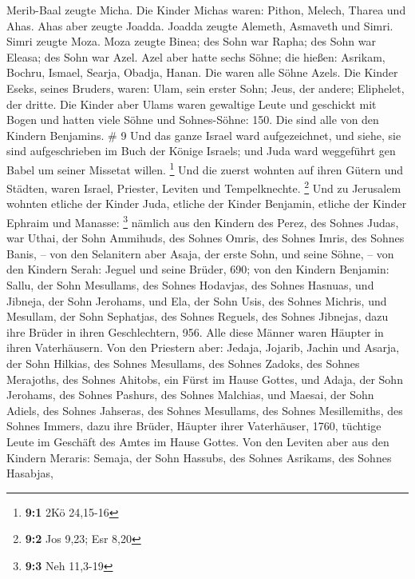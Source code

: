 Merib-Baal zeugte Micha.  Die Kinder Michas waren: Pithon,
Melech, Tharea und Ahas.  Ahas aber zeugte Joadda. Joadda
zeugte Alemeth, Asmaveth und Simri. Simri zeugte Moza. 
Moza zeugte Binea; des Sohn war Rapha; des Sohn war Eleasa; des Sohn war
Azel.  Azel aber hatte sechs Söhne; die hießen: Asrikam,
Bochru, Ismael, Searja, Obadja, Hanan. Die waren alle Söhne Azels.
 Die Kinder Eseks, seines Bruders, waren: Ulam, sein erster
Sohn; Jeus, der andere; Eliphelet, der dritte.  Die Kinder
aber Ulams waren gewaltige Leute und geschickt mit Bogen und hatten
viele Söhne und Sohnes-Söhne: 150. Die sind alle von den Kindern
Benjamins. \# 9  Und das ganze Israel ward aufgezeichnet,
und siehe, sie sind aufgeschrieben im Buch der Könige Israels; und Juda
ward weggeführt gen Babel um seiner Missetat willen. \footnote{\textbf{9:1}
  2Kö 24,15-16}  Und die zuerst wohnten auf ihren Gütern und
Städten, waren Israel, Priester, Leviten und Tempelknechte. \footnote{\textbf{9:2}
  Jos 9,23; Esr 8,20}  Und zu Jerusalem wohnten etliche der
Kinder Juda, etliche der Kinder Benjamin, etliche der Kinder Ephraim und
Manasse: \footnote{\textbf{9:3} Neh 11,3-19}  nämlich aus
den Kindern des Perez, des Sohnes Judas, war Uthai, der Sohn Ammihuds,
des Sohnes Omris, des Sohnes Imris, des Sohnes Banis, -- 
von den Selanitern aber Asaja, der erste Sohn, und seine Söhne, --
 von den Kindern Serah: Jeguel und seine Brüder, 690;
 von den Kindern Benjamin: Sallu, der Sohn Mesullams, des
Sohnes Hodavjas, des Sohnes Hasnuas,  und Jibneja, der Sohn
Jerohams, und Ela, der Sohn Usis, des Sohnes Michris, und Mesullam, der
Sohn Sephatjas, des Sohnes Reguels, des Sohnes Jibnejas, 
dazu ihre Brüder in ihren Geschlechtern, 956. Alle diese Männer waren
Häupter in ihren Vaterhäusern.  Von den Priestern aber:
Jedaja, Jojarib, Jachin  und Asarja, der Sohn Hilkias, des
Sohnes Mesullams, des Sohnes Zadoks, des Sohnes Merajoths, des Sohnes
Ahitobs, ein Fürst im Hause Gottes,  und Adaja, der Sohn
Jerohams, des Sohnes Pashurs, des Sohnes Malchias, und Maesai, der Sohn
Adiels, des Sohnes Jahseras, des Sohnes Mesullams, des Sohnes
Mesillemiths, des Sohnes Immers,  dazu ihre Brüder, Häupter
ihrer Vaterhäuser, 1760, tüchtige Leute im Geschäft des Amtes im Hause
Gottes.  Von den Leviten aber aus den Kindern Meraris:
Semaja, der Sohn Hassubs, des Sohnes Asrikams, des Sohnes Hasabjas,
